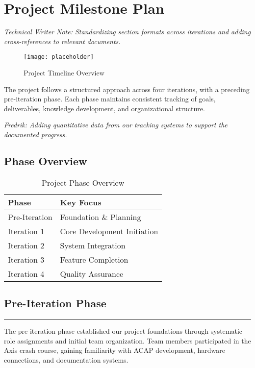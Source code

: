 \section{Project Milestone Plan}

\textit{Technical Writer Note: Standardizing section formats across iterations and adding cross-references to relevant documents.}

\begin{figure}[t!]
\centering
\texttt{[image: placeholder]}
\caption{Project Timeline Overview}
\label{fig:timeline}
\end{figure}

The project follows a structured approach across four iterations, with a preceding pre-iteration phase. Each phase maintains consistent tracking of goals, deliverables, knowledge development, and organizational structure.

\textit{Fredrik: Adding quantitative data from our tracking systems to support the documented progress.}

\subsection*{Phase Overview}
\begin{table}[h!]
\begin{tabularx}{\textwidth}{>{\raggedright\arraybackslash}X>{\raggedright\arraybackslash}X}
\toprule
\textbf{Phase} & \textbf{Key Focus} \\
\midrule
Pre-Iteration & Foundation \& Planning \\
Iteration 1 & Core Development Initiation \\
Iteration 2 & System Integration \\
Iteration 3 & Feature Completion \\
Iteration 4 & Quality Assurance \\
\bottomrule
\end{tabularx}
\caption{Project Phase Overview}
\label{tab:phase-overview}
\end{table}

\subsection{Pre-Iteration Phase}
\noindent\rule{\textwidth}{0.4pt}

The pre-iteration phase established our project foundations through systematic role assignments and initial team organization. Team members participated in the Axis crash course, gaining familiarity with ACAP development, hardware connections, and documentation systems. 

